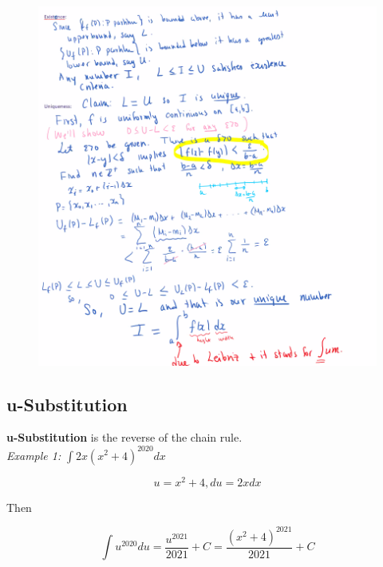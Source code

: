         \begin{figure}[hbt!]
            \centering
            \includegraphics[]{Integral_Def}
        \end{figure}

    \subsection{u-Substitution}

        \textbf{u-Substitution} is the reverse of the chain rule. \\

        \textit{Example 1:} $\int 2x (x^2 + 4)^{2020}dx$

        \[
            u = x^2 + 4, du = 2x dx
        \]

        Then

        \[
            \int u^{2020} du = \frac{u^{2021}}{2021} + C = \frac{(x^2 + 4)^{2021}}{2021} + C
        \]


